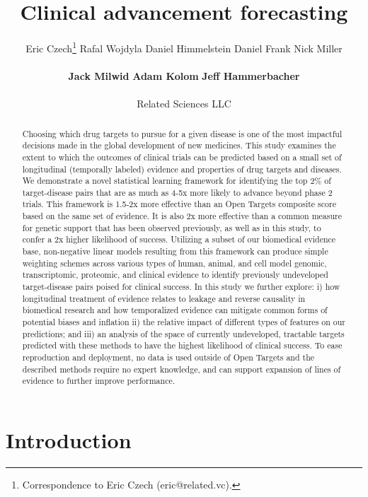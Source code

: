 \documentclass{article}
\title{Clinical advancement forecasting}
\author{
  Eric Czech\thanks{Correspondence to Eric Czech (eric@related.vc).} \hspace{0.2cm} 
  Rafal Wojdyla \hspace{0.2cm} 
  Daniel Himmelstein \hspace{0.2cm}
  Daniel Frank \hspace{0.2cm} 
  Nick Miller \hspace{0.2cm} 
  \\ \\
  \textbf{Jack Milwid} \hspace{0.2cm} 
  \textbf{Adam Kolom} \hspace{0.2cm} 
  \textbf{Jeff Hammerbacher}
  \\ \\
  Related Sciences LLC
}
\begin{document}
\maketitle


\def\evaluationDatasetPairCount{9010}
\def\topRankingPct{2}
\def\bottomRankingPct{98}

\begin{abstract}
Choosing which drug targets to pursue for a given disease is one of the most impactful decisions made in the global development of new medicines. This study examines the extent to which the outcomes of clinical trials can be predicted based on a small set of longitudinal (temporally labeled) evidence and properties of drug targets and diseases. We demonstrate a novel statistical learning framework for identifying the top \topRankingPct\% of target-disease pairs that are as much as 4-5x more likely to advance beyond phase 2 trials. This framework is 1.5-2x more effective than an Open Targets composite score based on the same set of evidence. It is also 2x more effective than a common measure for genetic support that has been observed previously, as well as in this study, to confer a 2x higher likelihood of success. Utilizing a subset of our biomedical evidence base, non-negative linear models resulting from this framework can produce simple weighting schemes across various types of human, animal, and cell model genomic, transcriptomic, proteomic, and clinical evidence to identify previously undeveloped target-disease pairs poised for clinical success. In this study we further explore: i) how longitudinal treatment of evidence relates to leakage and reverse causality in biomedical research and how temporalized evidence can mitigate common forms of potential biases and inflation ii) the relative impact of different types of features on our predictions; and iii) an analysis of the space of currently undeveloped, tractable targets predicted with these methods to have the highest likelihood of clinical success. To ease reproduction and deployment, no data is used outside of Open Targets and the described methods require no expert knowledge, and can support expansion of lines of evidence to further improve performance.
\end{abstract}

\section{Introduction}
\label{sec:introduction}
\end{document}
